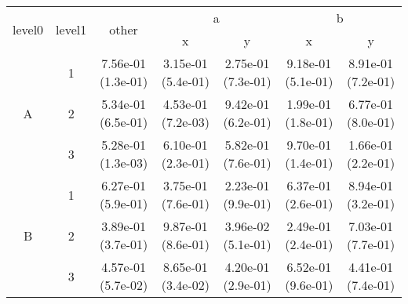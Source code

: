 \begin{tabular}{ccccccc}
\toprule
\multirow{2}{*}{level0} & \multirow{2}{*}{level1}& \multirow{2}{*}{other}&\multicolumn{2}{c}{a}&\multicolumn{2}{c}{b}\tabularnewline
\cmidrule(lr){4-5}
\cmidrule(lr){6-7}
&&&x&y&x&y\tabularnewline
\midrule
\multirow{3}{*}{A}&1& 7.56e-01 (1.3e-01)& 3.15e-01 (5.4e-01)& 2.75e-01 (7.3e-01)& 9.18e-01 (5.1e-01)& 8.91e-01 (7.2e-01)\tabularnewline
&2& 5.34e-01 (6.5e-01)& 4.53e-01 (7.2e-03)& 9.42e-01 (6.2e-01)& 1.99e-01 (1.8e-01)& 6.77e-01 (8.0e-01)\tabularnewline
&3& 5.28e-01 (1.3e-03)& 6.10e-01 (2.3e-01)& 5.82e-01 (7.6e-01)& 9.70e-01 (1.4e-01)& 1.66e-01 (2.2e-01)\tabularnewline
\midrule
\multirow{3}{*}{B}&1& 6.27e-01 (5.9e-01)& 3.75e-01 (7.6e-01)& 2.23e-01 (9.9e-01)& 6.37e-01 (2.6e-01)& 8.94e-01 (3.2e-01)\tabularnewline
&2& 3.89e-01 (3.7e-01)& 9.87e-01 (8.6e-01)& 3.96e-02 (5.1e-01)& 2.49e-01 (2.4e-01)& 7.03e-01 (7.7e-01)\tabularnewline
&3& 4.57e-01 (5.7e-02)& 8.65e-01 (3.4e-02)& 4.20e-01 (2.9e-01)& 6.52e-01 (9.6e-01)& 4.41e-01 (7.4e-01)\tabularnewline
\bottomrule
\end{tabular}
